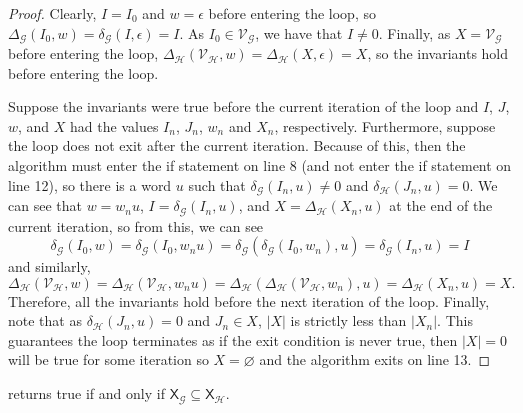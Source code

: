 \documentclass[hidelinks]{report}
\newcommand{\Gc}{\mathcal{G}}  %
\newcommand{\Hc}{\mathcal{H}}  %
\newcommand{\Vc}{\mathcal{V}}
\newcommand{\shift}[1]{\mathsf{X}_{#1}}
\theoremstyle{definition}
\begin{document}
\begin{proof}
    Clearly, \(I = I_0\) and \(w = \epsilon\) before entering the loop, so \(\Delta_\Gc(I_0, w) = \delta_\Gc(I, \epsilon) = I\).
    As \(I_0 \in \Vc_\Gc\), we have that \(I \neq 0\). Finally, as \(X = \Vc_\Gc\) before 
    entering the loop, \(\Delta_\Hc(\Vc_\Hc, w) = \Delta_\Hc(X, \epsilon) = X\), so the invariants hold 
    before entering the loop.

    Suppose the invariants were true before the current iteration of the loop and \(I\), \(J\), \(w\), and \(X\)
    had the values \(I_n\), \(J_n\), \(w_n\) and \(X_n\), respectively. Furthermore, suppose the loop does not exit
    after the current iteration. Because of this, then the algorithm must enter the 
    if statement on line 8 (and not enter the if statement on line 12), so there is a word \(u\) such that \(\delta_\Gc(I_n, u) \neq 0\)
    and \(\delta_\Hc(J_n, u) = 0\). We can see that \(w = w_n u\), \(I = \delta_\Gc(I_n, u)\), and 
    \(X = \Delta_\Hc(X_n, u)\) at the end of the current iteration, so from this, we can see 
    \[\delta_\Gc(I_0, w) = \delta_\Gc(I_0, w_n u) = \delta_\Gc(\delta_\Gc(I_0, w_n), u) = \delta_\Gc(I_n, u) = I\]
    and similarly,
    \[\Delta_\Hc(\Vc_\Hc, w) = \Delta_\Hc(\Vc_\Hc, w_n u) = \Delta_\Hc(\Delta_\Hc(\Vc_\Hc, w_n), u) = \Delta_\Hc(X_n, u) = X.\]
    Therefore, all the invariants hold before the next iteration of the loop.
    Finally, note that as \(\delta_\Hc(J_n, u) = 0\) and \(J_n \in X\), \(|X|\) is strictly less 
    than \(|X_n|\). This guarantees the loop terminates as if the exit condition is never 
    true, then \(|X| = 0\) will be true for some iteration so \(X = \varnothing\) and the algorithm exits on line 13. 
\end{proof}

\begin{theorem}
     returns true if and only if \(\shift{\Gc} \subseteq \shift{\Hc}\).
\end{theorem}
\end{document}
